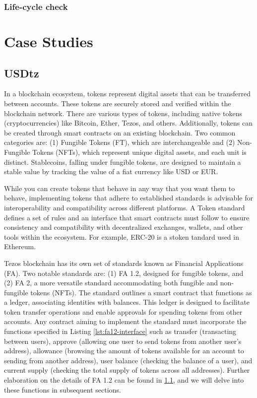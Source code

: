 \documentclass[a4paper,UKenglish,cleveref, autoref, thm-restate]{lipics-v2021}
\begin{document}
\subsubsection{Life-cycle check}
\section {Case Studies}
\subsection{USDtz}
In a blockchain ecosystem, tokens represent digital assets that can be transferred between accounts. These tokens are securely stored and verified within the blockchain network. There are various types of tokens, including native tokens (cryptocurrencies) like Bitcoin, Ether, Tezos, and others. Additionally, tokens can be created through smart contracts on an existing blockchain. Two common categories are: (1) Fungible Tokens (FT), which are interchangeable and (2) Non-Fungible Tokens (NFTs), which represent unique digital assets, and each unit is distinct. Stablecoins, falling under fungible tokens, are designed to maintain a stable value by tracking the value of a fiat currency like USD or EUR.

While you can create tokens that behave in any way that you want them to behave, implementing tokens that adhere to established standards is advisable for interoperability and compatibility across different platforms. A Token standard defines a set of rules and an interface that smart contracts must follow to ensure consistency and compatibility with decentralized exchanges, wallets, and other tools within the ecosystem. For example, ERC-20 is a stoken tandard used in Ethereum. 

Tezos blockchain has its own set of standards known as Financial Applications (FA). Two notable standards are: (1) FA 1.2, designed for fungible tokens, and (2) FA 2, a more versatile standard accommodating both fungible and non-fungible tokens (NFTs).  The standard outlines a smart contract that functions as a ledger, associating identities with balances. This ledger is designed to facilitate token transfer operations and enable approvals for spending tokens from other accounts. Any contract aiming to implement the standard must incorporate the functions specified in Listing \ref{lst:fa12-interface} such as transfer (transacting between users), approve (allowing one user to send tokens from another user's address), allowance (browsing the amount of tokens available for an account to sending from another address), user balance (checking the balance of a user), and current supply (checking the total supply of tokens across all addresses). Further elaboration on the details of FA 1.2 can be found in \ref{}, and we will delve into these functions in subsequent sections.
\end{document}
